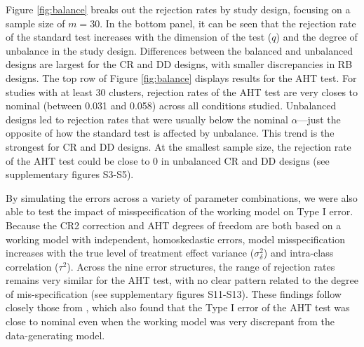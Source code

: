 \documentclass[12pt]{article}\usepackage[]{graphicx}\usepackage[]{color}
\begin{document}
Figure \ref{fig:balance} breaks out the rejection rates by study design, focusing on a sample size of $m = 30$. 
In the bottom panel, it can be seen that the rejection rate of the standard test increases with the dimension of the test ($q$) and the degree of unbalance in the study design.
Differences between the balanced and unbalanced designs are largest for the CR and DD designs, with smaller discrepancies in RB designs.
The top row of Figure \ref{fig:balance} displays results for the AHT test.
For studies with at least 30 clusters, rejection rates of the AHT test are very closes to nominal (between 0.031 and 0.058) across all conditions studied.
Unbalanced designs led to rejection rates that were usually below the nominal $\alpha$---just the opposite of how the standard test is affected by unbalance. 
This trend is the strongest for CR and DD designs. At the smallest sample size, the rejection rate of the AHT test could be close to 0 in unbalanced CR and DD designs (see supplementary figures S3-S5). 

By simulating the errors across a variety of parameter combinations, we were also able to test the impact of misspecification of the working model on Type I error.
Because the CR2 correction and AHT degrees of freedom are both based on a working model with independent, homoskedastic errors, model misspecification increases with the true level of treatment effect variance ($\sigma_\delta^2$) and intra-class correlation ($\tau^2$).
Across the nine error structures, the range of rejection rates remains very similar for the AHT test, with no clear pattern related to the degree of mis-specification (see supplementary figures S11-S13). 
These findings follow closely those from , which also found that the Type I error of the AHT test was close to nominal even when the working model was very discrepant from the data-generating model.
\end{document}
